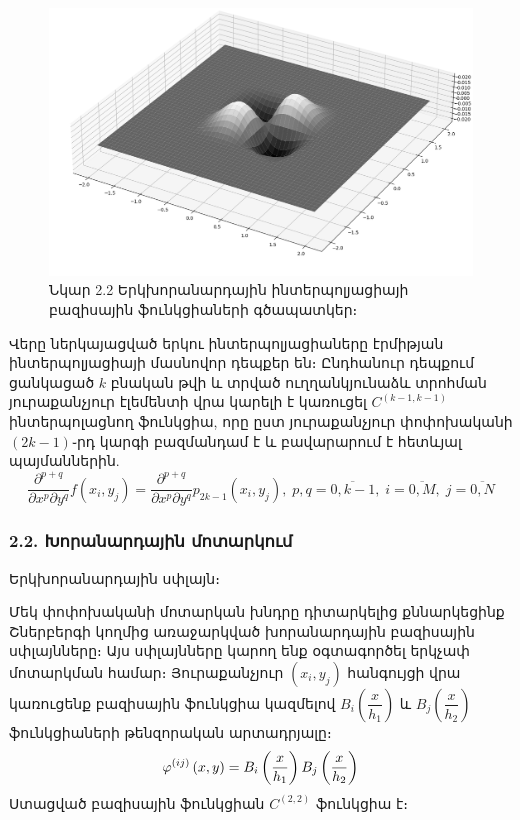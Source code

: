 \documentclass[fleqn, bachelor,subf,12pt,notitlepage]{article}
\begin{document}
\begin{figure}[H]
\begin{minipage}[b]{0.45\textwidth}
  \end{minipage}
\hfill
  \begin{minipage}[b]{0.45\textwidth}
    \includegraphics[width=\textwidth]{images/two_dimensional_ermite_4}
  \end{minipage}
\captionsetup{labelformat=empty}
\caption{Նկար 2.2 Երկխորանարդային ինտերպոլյացիայի բազիսային ֆունկցիաների գծապատկեր։}
\end{figure}

Վերը ներկայացված երկու ինտերպոլյացիաները էրմիթյան ինտերպոլյացիայի մասնովոր դեպքեր են։
Ընդհանուր դեպքում ցանկացած $k$ բնական թվի և տրված ուղղանկյունաձև տրոհման յուրաքանչյուր էլեմենտի վրա կարելի է կառուցել $C^{\left(k-1, k-1\right)}$ ինտերպոլացնող ֆունկցիա, որը ըստ յուրաքանչյուր փոփոխականի $\left(2k-1\right)$֊րդ կարգի բազմանդամ է և բավարարում է հետևյալ պայմաններին.
\begin{equation}
\dfrac{\partial^{p+q}}{\partial x^{p} \partial y^{q}}f\left(x_{i}, y_{j}\right)=\dfrac{\partial^{p+q}}{\partial x^{p} \partial y^{q}}p_{2k-1}\left(x_{i}, y_{j}\right), \; p,q=\overline{0, k-1}, \;  i=\overline{0, M}, \; j=\overline{0, N}
\end{equation}

\newpage
\subsubsection*{2.2. Խորանարդային մոտարկում}

Երկխորանարդային սփլայն։

Մեկ փոփոխականի մոտարկան խնդրը դիտարկելից քննարկեցինք Շներբերգի կողմից առաջարկված խորանարդային բազիսային սփլայնները։ Այս սփլայնները կարող ենք  օգտագործել երկչափ մոտարկման համար։
Յուրաքանչյուր $\left(x_{i}, y_{j}\right)$ հանգույցի վրա կառուցենք բազիսային ֆունկցիա կազմելով $B_{i}\left(\dfrac{x}{h_{1}}\right)$ և $B_{j}\left(\dfrac{x}{h_{2}}\right)$ ֆունկցիաների թենզորական  արտադրյալը։
\begin{equation}
\varphi^{(ij)}\left(x, y\right) = B_{i}\left(\dfrac{x}{h_{1}}\right) B_{j}\left(\dfrac{x}{h_{2}}\right)$$
\end{equation}
Ստացված բազիսային ֆունկցիան $C^{(2, 2)}$ ֆունկցիա է։
\end{document}

